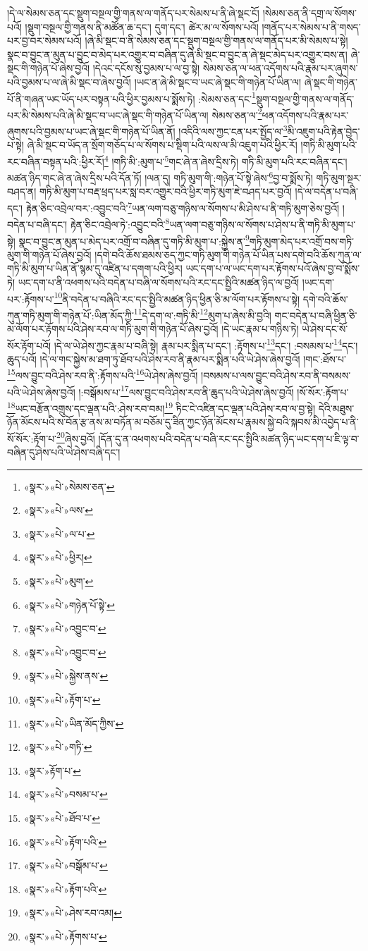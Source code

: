 །དེ་ལ་སེམས་ཅན་དང་སྡུག་བསྔལ་གྱི་གནས་ལ་གནོད་པར་སེམས་པ་ནི་ཞེ་སྡང་ངོ། །སེམས་ཅན་ནི་དགྲ་ལ་སོགས་པའོ། །སྡུག་བསྔལ་གྱི་གནས་ནི་མཚོན་ཆ་དང་། དུག་དང་། ཚེར་མ་ལ་སོགས་པའོ། །གནོད་པར་སེམས་པ་ནི་གསད་པར་བྱ་བར་སེམས་པའོ། །ཞེ་མི་སྡང་བ་ནི་སེམས་ཅན་དང་སྡུག་བསྔལ་གྱི་གནས་ལ་གནོད་པར་མི་སེམས་པ་སྟེ། སྣང་བ་བྱུང་ན་མུན་པ་བྱུང་བ་མེད་པར་འགྱུར་བ་བཞིན་དུ་ཞེ་མི་སྡང་བ་བྱུང་ན་ཞེ་སྡང་མེད་པར་འགྱུར་བས་ན། ཞེ་སྡང་གི་གཉེན་པོ་ཞེས་བྱའོ། །དེའང་དངོས་སུ་བྱམས་པ་ལ་བྱ་སྟེ། སེམས་ཅན་ལ་ཕན་འདོགས་པའི་རྣམ་པར་ཞུགས་པའི་བྱམས་པ་ལ་ཞེ་མི་སྡང་བ་ཞེས་བྱའོ། །ཡང་ན་ཞེ་མི་སྡང་བ་ཡང་ཞེ་སྡང་གི་གཉེན་པོ་ཡིན་ལ། ཞེ་སྡང་གི་གཉེན་པོ་ནི་གཞན་ཡང་ཡོད་པར་བསྟན་པའི་ཕྱིར་བྱམས་པ་སྨོས་ཏེ། :སེམས་ཅན་དང་\footnote{«སྣར་»«པེ་»སེམས་ཅན་}སྡུག་བསྔལ་གྱི་གནས་ལ་གནོད་པར་མི་སེམས་པའི་ཞེ་མི་སྡང་བ་ཡང་ཞེ་སྡང་གི་གཉེན་པོ་ཡིན་ལ། སེམས་ཅན་ལ་\footnote{«སྣར་»«པེ་»ལས་}ཕན་འདོགས་པའི་རྣམ་པར་ཞུགས་པའི་བྱམས་པ་ཡང་ཞེ་སྡང་གི་གཉེན་པོ་ཡིན་ནོ། །འདིའི་ལས་ཀྱང་ངན་པར་སྤྱོད་ལ་\footnote{«སྣར་»«པེ་»ལ་པ་}མི་འཇུག་པའི་རྟེན་བྱེད་པ་སྟེ། ཞེ་མི་སྡང་བ་ཡོད་ན་སྲོག་གཅོད་པ་ལ་སོགས་པ་སྡིག་པའི་ལས་ལ་མི་འཇུག་པའི་ཕྱིར་རོ། །གཏི་མི་མུག་པའི་རང་བཞིན་བསྟན་པའི་:ཕྱིར་རོ།\footnote{«སྣར་»«པེ་»ཕྱིར།} །གཏི་མི་:མུག་པ་\footnote{«སྣར་»«པེ་»མུག་}གང་ཞེ་ན་ཞེས་དྲིས་ཏེ། གཏི་མི་མུག་པའི་རང་བཞིན་དང་། མཚན་ཉིད་གང་ཞེ་ན་ཞེས་དྲིས་པའི་དོན་ཏོ། །ལན་དུ། གཏི་མུག་གི་:གཉེན་པོ་སྟེ་ཞེས་\footnote{«སྣར་»«པེ་»གཉེན་པོ་སྟེ་}བྱ་བ་སྨོས་ཏེ། གཏི་མུག་སྔར་བཤད་ན། གཏི་མི་མུག་པ་བརྡ་ཕྲད་པར་སླ་བར་འགྱུར་བའི་ཕྱིར་གཏི་མུག་ཇེ་བཤད་པར་བྱའོ། །དེ་ལ་བདེན་པ་བཞི་དང་། རྟེན་ཅིང་འབྲེལ་བར་:འབྱུང་བའི་\footnote{«སྣར་»«པེ་»འབྱུང་བ་}ཡན་ལག་བཅུ་གཉིས་ལ་སོགས་པ་མི་ཤེས་པ་ནི་གཏི་མུག་ཅེས་བྱའོ། །བདེན་པ་བཞི་དང་། རྟེན་ཅིང་འབྲེལ་ཏེ་:འབྱུང་བའི་\footnote{«སྣར་»«པེ་»འབྱུང་བ་}ཡན་ལག་བཅུ་གཉིས་ལ་སོགས་པ་ཤེས་པ་ནི་གཏི་མི་མུག་པ་སྟེ། སྣང་བ་བྱུང་ན་མུན་པ་མེད་པར་འགྲོ་བ་བཞིན་དུ་གཏི་མི་མུག་པ་:སྐྱེས་ན་\footnote{«སྣར་»«པེ་»སྐྱེས་ནས་}གཏི་མུག་མེད་པར་འགྲོ་བས་གཏི་མུག་གི་གཉེན་པོ་ཞེས་བྱའོ། །དགེ་བའི་ཆོས་ཐམས་ཅད་ཀྱང་གཏི་མུག་གི་གཉེན་པོ་ཡིན་པས་དགེ་བའི་ཆོས་ཀུན་ལ་གཏི་མི་མུག་པ་ཡིན་ནོ་སྙམ་དུ་འཛིན་པ་དགག་པའི་ཕྱིར། ཡང་དག་པ་ལ་ཡང་དག་པར་རྟོགས་པའོ་ཞེས་བྱ་བ་སྨོས་ཏེ། ཡང་དག་པ་ནི་འཕགས་པའི་བདེན་པ་བཞི་ལ་སོགས་པའི་རང་དང་སྤྱིའི་མཚན་ཉིད་ལ་བྱའོ། །ཡང་དག་པར་:རྟོགས་པ་\footnote{«སྣར་»«པེ་»རྟོག་པ་}ནི་བདེན་པ་བཞིའི་རང་དང་སྤྱིའི་མཚན་ཉིད་ཕྱིན་ཅི་མ་ལོག་པར་རྟོགས་པ་སྟེ། དགེ་བའི་ཆོས་ཀུན་གཏི་མུག་གི་གཉེན་པོ་:ཡིན་མོད་ཀྱི་\footnote{«སྣར་»«པེ་»ཡིན་མོད་ཀྱིས་}དེ་དག་ལ་:གཏི་མི་\footnote{«སྣར་»«པེ་»གཏི་}མུག་པ་ཞེས་མི་བྱའི། གང་བདེན་པ་བཞི་ཕྱིན་ཅི་མ་ལོག་པར་རྟོགས་པའི་ཤེས་རབ་ལ་གཏི་མུག་གི་གཉེན་པོ་ཞེས་བྱའོ། །དེ་ཡང་རྣམ་པ་གཉིས་ཏེ། ཡེ་ཤེས་དང་སོ་སོར་རྟོག་པའོ། །དེ་ལ་ཡེ་ཤེས་ཀྱང་རྣམ་པ་བཞི་སྟེ། རྣམ་པར་སྨིན་པ་དང་། :རྟོགས་པ་\footnote{«སྣར་»རྟོག་པ་}དང་། :བསམས་པ་\footnote{«སྣར་»«པེ་»བསམ་པ་}དང་། ཆུད་པའོ། །དེ་ལ་གང་སྐྱེས་མ་ཐག་ཏུ་ཐོབ་པའི་ཤེས་རབ་ནི་རྣམ་པར་སྨིན་པའི་ཡེ་ཤེས་ཞེས་བྱའོ། །གང་:ཐོས་པ་\footnote{«སྣར་»«པེ་»ཐོབ་པ་}ལས་བྱུང་བའི་ཤེས་རབ་ནི་:རྟོགས་པའི་\footnote{«སྣར་»«པེ་»རྟོག་པའི་}ཡེ་ཤེས་ཞེས་བྱའོ། །བསམས་པ་ལས་བྱུང་བའི་ཤེས་རབ་ནི་བསམས་པའི་ཡེ་ཤེས་ཞེས་བྱའོ། །:བསྒོམས་པ་\footnote{«སྣར་»«པེ་»བསྒོམ་པ་}ལས་བྱུང་བའི་ཤེས་རབ་ནི་ཆུད་པའི་ཡེ་ཤེས་ཞེས་བྱའོ། །སོ་སོར་:རྟོག་པ་\footnote{«སྣར་»«པེ་»རྟོག་པའི་}ཡང་བརྩོན་འགྲུས་དང་ལྡན་པའི་:ཤེས་རབ་བམ།\footnote{«སྣར་»«པེ་»ཤེས་རབ་འམ།} ཏིང་ངེ་འཛིན་དང་ལྡན་པའི་ཤེས་རབ་ལ་བྱ་སྟེ། དེའི་མཐུས་ཉོན་མོངས་པའི་ས་བོན་རྩ་ནས་མ་བཏོན་མ་བཅོམ་དུ་ཟིན་ཀྱང་ཉོན་མོངས་པ་རྣམས་སྐྱེ་བའི་སྐབས་མི་འབྱེད་པ་ནི་སོ་སོར་:རྟོག་པ་\footnote{«སྣར་»«པེ་»རྟོགས་པ་}ཞེས་བྱའོ། །དོན་དུ་ན་འཕགས་པའི་བདེན་པ་བཞི་རང་དང་སྤྱིའི་མཚན་ཉིད་ཡང་དག་པ་ཇི་ལྟ་བ་བཞིན་དུ་ཤེས་པའི་ཡེ་ཤེས་བཞི་དང་། 